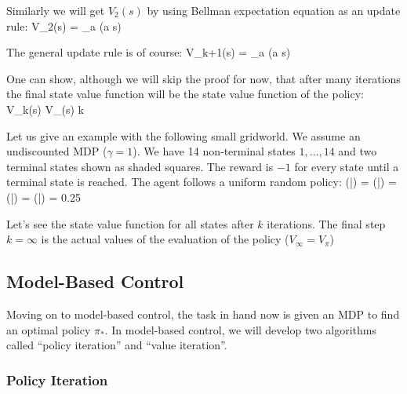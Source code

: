 Similarly we will get $V_2(s)$ by using Bellman expectation equation as an update rule:
\bse
V_{2}(s) = \sum_{a} \pi(a \mid s) 
\ese

The general update rule is of course:
\bse
V_{k+1}(s) = \sum_{a} \pi(a \mid s) 
\ese

One can show, although we will skip the proof for now, that after many iterations the final state value function will
be the state value function of the policy:
\bse
V_k(s) \to V_{\pi}(s) \:\:  \:\: k \to \infty
\ese

\be
Let us give an example with the following small gridworld. We assume an undiscounted MDP ($\gamma = 1$). We have 14
non-terminal states $1, \ldots, 14$ and two terminal states shown as shaded squares. The reward is $-1$ for every
state until a terminal state is reached. The agent follows a uniform random policy:
\bse
\pi(|) = \pi(|) = \pi(|)
= \pi(|) = 0.25
\ese


Let's see the state value function for all states after $k$ iterations. The final step $k=\infty$ is the actual
values of the evaluation of the policy ($V_\infty = V_\pi$)

\vspace{-10pt}

\begin{figure}[H]
\centering
\subfloat{{\texttt{[image: rl11]}}}
\qquad \qquad
\subfloat{{\texttt{[image: rl12]}}}
\end{figure}
\ee

\subsection{Model-Based Control}

Moving on to model-based control, the task in hand now is given an MDP to find an optimal policy $\pi_{*}$. In
model-based control, we will develop two algorithms called ``policy iteration'' and ``value iteration''.

\subsubsection{Policy Iteration}

